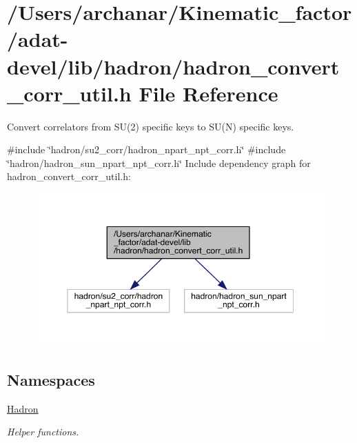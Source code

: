 \hypertarget{adat-devel_2lib_2hadron_2hadron__convert__corr__util_8h}{}\section{/\+Users/archanar/\+Kinematic\+\_\+factor/adat-\/devel/lib/hadron/hadron\+\_\+convert\+\_\+corr\+\_\+util.h File Reference}
\label{adat-devel_2lib_2hadron_2hadron__convert__corr__util_8h}


Convert correlators from S\+U(2) specific keys to S\+U(\+N) specific keys.  


{\ttfamily \#include \char`\"{}hadron/su2\+\_\+corr/hadron\+\_\+npart\+\_\+npt\+\_\+corr.\+h\char`\"{}}\newline
{\ttfamily \#include \char`\"{}hadron/hadron\+\_\+sun\+\_\+npart\+\_\+npt\+\_\+corr.\+h\char`\"{}}\newline
Include dependency graph for hadron\+\_\+convert\+\_\+corr\+\_\+util.\+h\+:
\nopagebreak
\begin{figure}[H]
\begin{center}
\leavevmode
\includegraphics[width=350pt]{de/d06/adat-devel_2lib_2hadron_2hadron__convert__corr__util_8h__incl}
\end{center}
\end{figure}
\subsection*{Namespaces}
\begin{DoxyCompactItemize}
\item 
 \mbox{\hyperlink{namespaceHadron}{Hadron}}
\begin{DoxyCompactList}\small\item\em Helper functions. \end{DoxyCompactList}\end{DoxyCompactItemize}
